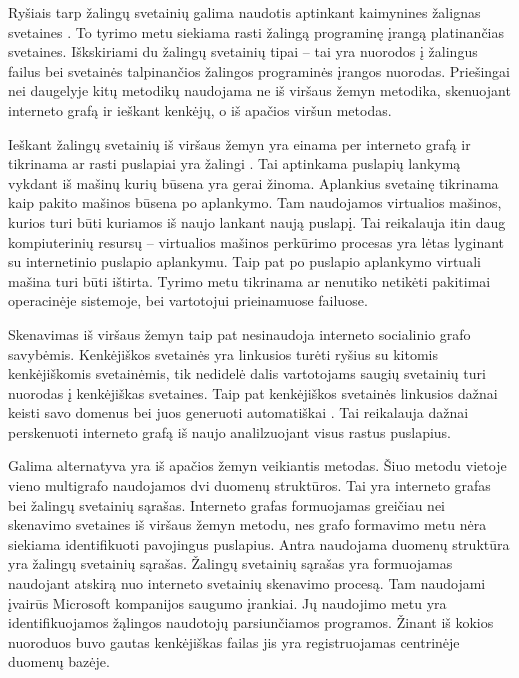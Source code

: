 
Ryšiais tarp žalingų svetainių galima naudotis aptinkant kaimynines žalignas svetaines \cite{webcop}.
To tyrimo metu siekiama rasti žalingą programinę įrangą platinančias svetaines. Iškskiriami du žalingų svetainių tipai --
tai yra nuorodos į žalingus failus bei svetainės talpinančios žalingos programinės įrangos nuorodas.
Priešingai nei daugelyje kitų metodikų naudojama ne iš viršaus žemyn metodika, skenuojant interneto grafą ir ieškant kenkėjų,
o iš apačios viršun metodas.

Ieškant žalingų svetainių iš viršaus žemyn yra einama per interneto grafą ir tikrinama ar rasti puslapiai yra žalingi \cite{webcop}.
Tai aptinkama puslapių lankymą vykdant iš mašinų kurių būsena yra gerai žinoma. Aplankius svetainę tikrinama kaip pakito
mašinos būsena po aplankymo. Tam naudojamos virtualios mašinos, kurios turi būti kuriamos iš naujo lankant naują puslapį.
Tai reikalauja itin daug kompiuterinių resursų -- virtualios mašinos perkūrimo procesas yra lėtas lyginant su
internetinio puslapio aplankymu. Taip pat po puslapio aplankymo virtuali mašina turi būti ištirta. Tyrimo metu tikrinama
ar nenutiko netikėti pakitimai operacinėje sistemoje, bei vartotojui prieinamuose failuose.

Skenavimas iš viršaus žemyn taip pat nesinaudoja interneto socialinio grafo savybėmis. Kenkėjiškos svetainės yra linkusios
turėti ryšius su kitomis kenkėjiškomis svetainėmis, tik nedidelė dalis vartotojams saugių svetainių turi nuorodas į
kenkėjiškas svetaines. Taip pat kenkėjiškos svetainės linkusios dažnai keisti savo domenus \cite{webcop} bei juos
generuoti automatiškai \cite{trees}. Tai reikalauja dažnai perskenuoti interneto grafą iš naujo analilzuojant visus
rastus puslapius.

Galima alternatyva yra iš apačios žemyn veikiantis metodas. Šiuo metodu vietoje vieno multigrafo naudojamos dvi duomenų
struktūros. Tai yra interneto grafas bei žalingų svetainių sąrašas. Interneto grafas formuojamas greičiau nei skenavimo
svetaines iš viršaus žemyn metodu, nes grafo formavimo metu nėra siekiama identifikuoti pavojingus puslapius. Antra naudojama
duomenų struktūra yra žalingų svetainių sąrašas. Žalingų svetainių sąrašas yra formuojamas naudojant atskirą nuo
interneto svetainių skenavimo procesą. Tam naudojami įvairūs Microsoft kompanijos saugumo įrankiai. Jų naudojimo metu
yra identifikuojamos žąlingos naudotojų parsiunčiamos programos. Žinant iš kokios nuoroduos buvo gautas kenkėjiškas failas
jis yra registruojamas centrinėje duomenų bazėje.

